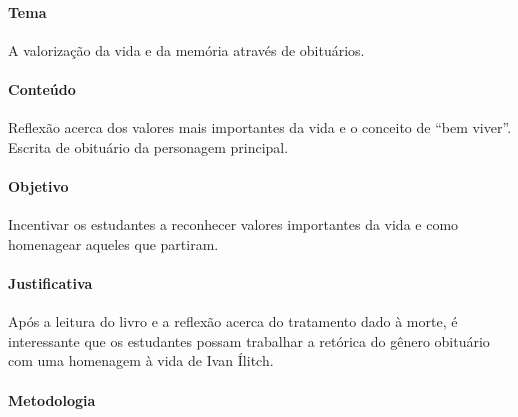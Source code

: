 \documentclass[12pt]{extarticle}
\begin{document}
\paragraph{Tema} A valorização da vida e da memória através de obituários.

\paragraph{Conteúdo} Reflexão acerca dos valores 
mais importantes da vida e o conceito de ``bem viver''.
Escrita de obituário da personagem principal.

\paragraph{Objetivo} Incentivar os estudantes a reconhecer
valores importantes da vida e como homenagear aqueles que partiram.

\paragraph{Justificativa} Após a leitura do livro e a reflexão acerca 
do tratamento dado à morte, é interessante que 
os estudantes possam trabalhar a retórica 
do gênero obituário com uma homenagem à vida de Ivan Ílitch.

\paragraph{Metodologia} 
\end{document}
